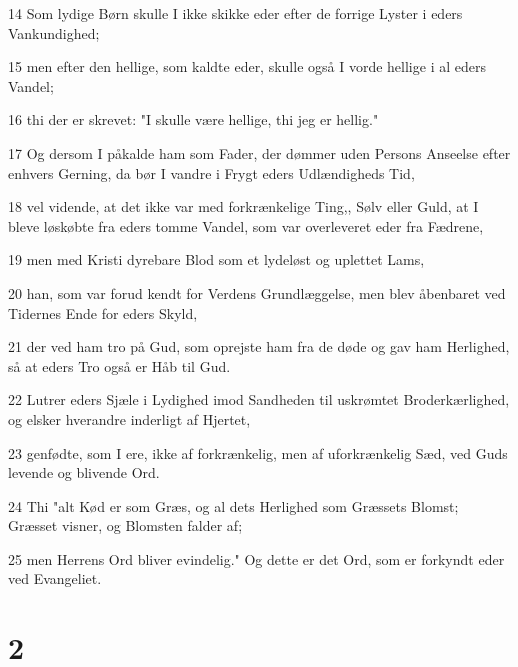 \par 14 Som lydige Børn skulle I ikke skikke eder efter de forrige Lyster i eders Vankundighed;
\par 15 men efter den hellige, som kaldte eder, skulle også I vorde hellige i al eders Vandel;
\par 16 thi der er skrevet: "I skulle være hellige, thi jeg er hellig."
\par 17 Og dersom I påkalde ham som Fader, der dømmer uden Persons Anseelse efter enhvers Gerning, da bør I vandre i Frygt eders Udlændigheds Tid,
\par 18 vel vidende, at det ikke var med forkrænkelige Ting,, Sølv eller Guld, at I bleve løskøbte fra eders tomme Vandel, som var overleveret eder fra Fædrene,
\par 19 men med Kristi dyrebare Blod som et lydeløst og uplettet Lams,
\par 20 han, som var forud kendt for Verdens Grundlæggelse, men blev åbenbaret ved Tidernes Ende for eders Skyld,
\par 21 der ved ham tro på Gud, som oprejste ham fra de døde og gav ham Herlighed, så at eders Tro også er Håb til Gud.
\par 22 Lutrer eders Sjæle i Lydighed imod Sandheden til uskrømtet Broderkærlighed, og elsker hverandre inderligt af Hjertet,
\par 23 genfødte, som I ere, ikke af forkrænkelig, men af uforkrænkelig Sæd, ved Guds levende og blivende Ord.
\par 24 Thi "alt Kød er som Græs, og al dets Herlighed som Græssets Blomst; Græsset visner, og Blomsten falder af;
\par 25 men Herrens Ord bliver evindelig." Og dette er det Ord, som er forkyndt eder ved Evangeliet.

\chapter{2}

